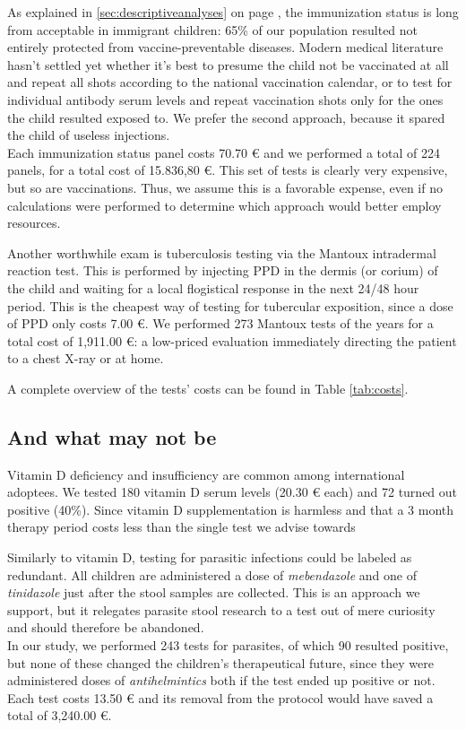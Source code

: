 As explained in \ref{sec:descriptiveanalyses} on page \pageref{sec:descriptiveanalyses}, the immunization status is long from acceptable in immigrant children: 65\% of our population resulted not entirely protected from vaccine-preventable diseases. Modern medical literature hasn't settled yet whether it's best to presume the child not be vaccinated at all and repeat all shots according to the national vaccination calendar, or to test for individual antibody serum levels and repeat vaccination shots only for the ones the child resulted exposed to. We prefer the second approach, because it spared the child of useless injections.\\
Each immunization status panel costs 70.70 € and we performed a total of 224 panels, for a total cost of 15.836,80 €. This set of tests  is clearly very expensive, but so are vaccinations. Thus, we assume this is a favorable expense, even if no calculations were performed to determine which approach would better employ resources.

Another worthwhile exam is tuberculosis testing via the Mantoux intradermal reaction test. This is performed by injecting PPD in the dermis (or corium) of the child and waiting for a local flogistical response in the next 24/48 hour period. This is the cheapest way of testing for tubercular exposition, since a dose of PPD only costs 7.00 €. We performed 273 Mantoux tests of the years for a total cost of 1,911.00 €: a low-priced evaluation immediately directing the patient to a chest X-ray or at home.

A complete overview of the tests' costs can be found in Table \ref{tab:costs}.

\subsection{And what may not be}\label{sub:notworthwhile}
Vitamin D deficiency and insufficiency are common among international adoptees. We tested 180 vitamin D serum levels (20.30 € each) and 72 turned out positive (40\%). Since vitamin D supplementation is harmless and that a 3 month therapy period costs less than the single test we advise towards 

Similarly to vitamin D, testing for parasitic infections could be labeled as redundant. All children are administered a dose of \textit{mebendazole} and one of \textit{tinidazole} just after the stool samples are collected. This is an approach we support, but it relegates parasite stool research to a test out of mere curiosity and should therefore be abandoned.\\
In our study, we performed 243 tests for parasites, of which 90 resulted positive, but none of these changed the children's therapeutical future, since they were administered doses of \textit{antihelmintics} both if the test ended up positive or not. Each test costs 13.50 € and its removal from the protocol would have saved a total of 3,240.00 €.

